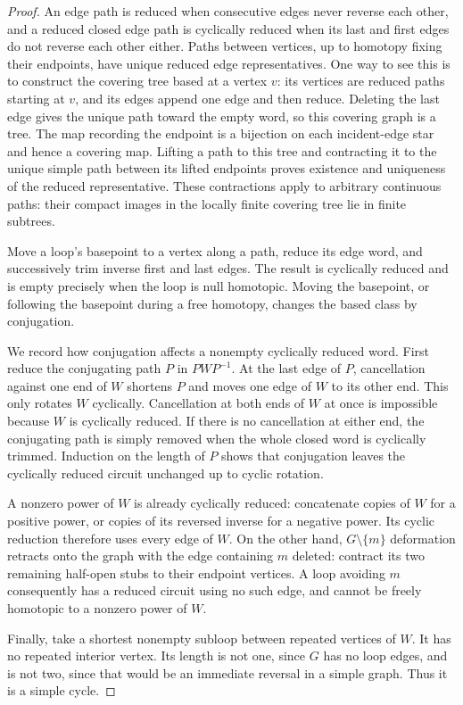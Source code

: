 \begin{proof}
An edge path is reduced when consecutive edges never reverse each
other, and a reduced closed edge path is cyclically reduced when its
last and first edges do not reverse each other either.  Paths between
vertices, up to homotopy fixing their endpoints, have unique reduced
edge representatives.  One way to see this is to construct the covering
tree based at a vertex $v$: its vertices are reduced paths starting at
$v$, and its edges append one edge and then reduce.  Deleting the last
edge gives the unique path toward the empty word, so this covering
graph is a tree.  The map recording the endpoint is a bijection on
each incident-edge star and hence a covering map.  Lifting a path to
this tree and contracting it to the unique simple path between its
lifted endpoints proves existence and uniqueness of the reduced
representative.  These contractions apply to arbitrary continuous
paths: their compact images in the locally finite covering tree lie
in finite subtrees.

Move a loop's basepoint to a vertex along a path, reduce its edge
word, and successively trim inverse first and last edges.  The result
is cyclically reduced and is empty precisely when the loop is null
homotopic.  Moving the basepoint, or following the basepoint during a
free homotopy, changes the based class by conjugation.

We record how conjugation affects a nonempty cyclically reduced word.
First reduce the conjugating path $P$ in $PWP^{-1}$.  At the last edge
of $P$, cancellation against one end of $W$ shortens $P$ and moves
one edge of $W$ to its other end.  This only rotates $W$ cyclically.
Cancellation at both ends of $W$ at once is impossible because $W$
is cyclically reduced.  If there is no cancellation at either end,
the conjugating path is simply removed when the whole closed word is
cyclically trimmed.  Induction on the length of $P$ shows that
conjugation leaves the cyclically reduced circuit unchanged up to
cyclic rotation.

A nonzero power of $W$ is already cyclically reduced: concatenate
copies of $W$ for a positive power, or copies of its reversed inverse
for a negative power.  Its cyclic reduction therefore uses every edge
of $W$.  On the other hand, $G\setminus\{m\}$ deformation retracts onto
the graph with the edge containing $m$ deleted: contract its two
remaining half-open stubs to their endpoint vertices.  A loop avoiding
$m$ consequently has a reduced circuit using no such edge, and cannot
be freely homotopic to a nonzero power of $W$.

Finally, take a shortest nonempty subloop between repeated vertices
of $W$.  It has no repeated interior vertex.  Its length is not one,
since $G$ has no loop edges, and is not two, since that would be an
immediate reversal in a simple graph.  Thus it is a simple cycle.
\end{proof}

